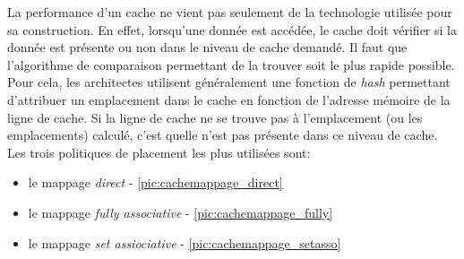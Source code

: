         La performance d'un cache ne vient pas seulement de la technologie utilisée pour sa construction. En effet, lorsqu'une donnée est accédée, le cache doit vérifier si la donnée est présente ou non dans le niveau de cache demandé. Il faut que l'algorithme de comparaison permettant de la trouver soit le plus rapide possible. Pour cela, les architectes utilisent généralement une fonction de \textit{hash} permettant d'attribuer un emplacement dans le cache en fonction de l'adresse mémoire de la ligne de cache. Si la ligne de cache ne se trouve pas à l'emplacement (ou les emplacements) calculé, c'est quelle n'est pas présente dans ce niveau de cache. Les trois politiques de placement les plus utilisées sont:
        \begin{itemize}
            \item le mappage  \textit{direct} - \autoref{pic:cachemappage_direct}
            \item le mappage \textit{fully associative} - \autoref{pic:cachemappage_fully}
            \item le mappage \textit{set assiociative} - \autoref{pic:cachemappage_setasso}
        \end{itemize}
        

